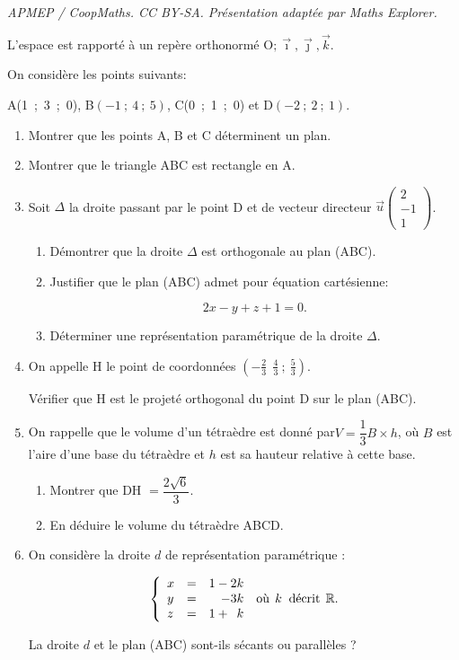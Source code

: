 \documentclass[10pt]{article}
\providecommand{\R}{\mathbb{R}}
\providecommand{\vect}[1]{\overrightarrow{#1}}
\providecommand{\Oijk}{\(\mathrm{O};\vec{\imath},\vec{\jmath},\vec{k}\)}
\begin{document}
\noindent\textit{APMEP / CoopMaths. CC BY-SA. Présentation adaptée par Maths Explorer.}\par\medskip
\medskip

L'espace est rapporté à un repère orthonormé \Oijk.

On considère les points suivants:

\begin{center}A(1~;~3~;~0), \quad B$(-1~;~4~;~5)$, \quad C(0~;~1~;~0) \quad et \quad D$(- 2~;~2~;~1)$.\end{center}

\begin{enumerate}
\item Montrer que les points A, B et C déterminent un plan.
\item Montrer que le triangle ABC est rectangle en A.
\item Soit $\Delta$ la droite passant par le point D et de vecteur directeur $\vect{u}\begin{pmatrix}2\\-1\\1\end{pmatrix}$.
	\begin{enumerate}
		\item Démontrer que la droite $\Delta$ est orthogonale au plan (ABC).
		\item Justifier que le plan (ABC) admet pour équation cartésienne:

\[2x - y + z + 1 = 0.\]

		\item Déterminer une représentation paramétrique de la droite $\Delta$.
	\end{enumerate}
\item On appelle H le point de coordonnées $\left(-\frac 23~ ~\frac 43~;~\frac 53\right)$.

Vérifier que H est le projeté orthogonal du point D sur le plan (ABC).
\item On rappelle que le volume d'un tétraèdre est donné par$ V = \dfrac 13 B \times h$, où $B$ est l'aire
 d'une base du tétraèdre et $h$ est sa hauteur relative à cette base.
	\begin{enumerate}
		\item Montrer que DH $=\dfrac{2\sqrt 6}{3}$.
		\item En déduire le volume du tétraèdre ABCD.
	\end{enumerate}
\item On considère la droite $d$ de représentation paramétrique :

\[\left\{\begin{array}{l c r}
x&=&1 - 2k\\
y&=& - 3k\\
z&=&1 + \phantom{3}k\end{array}\right. \: \text{où}\:\: k \:\ \text{décrit}\:\: \R.\]

La droite $d$ et le plan (ABC) sont-ils sécants ou parallèles ?
\end{enumerate}

\bigskip
\end{document}
